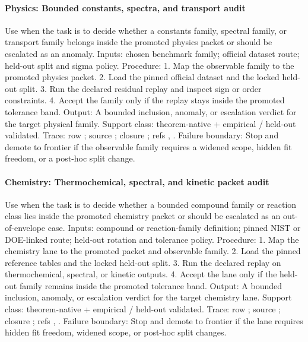 \paragraph{Physics: Bounded constants, spectra, and transport audit}
Use when the task is to decide whether a constants family, spectral family, or transport family belongs inside the promoted physics packet or should be escalated as an anomaly.
Inputs: chosen benchmark family; \allowbreak official dataset route; \allowbreak held-out split and sigma policy.
Procedure: 1. Map the observable family to the promoted physics packet. 2. Load the pinned official dataset and the locked held-out split. 3. Run the declared residual replay and inspect sign or order constraints. 4. Accept the family only if the replay stays inside the promoted tolerance band.
Output: A bounded inclusion, anomaly, or escalation verdict for the target physical family.
Support class: theorem-native + empirical / held-out validated.
Trace: row ; \allowbreak source ; \allowbreak closure ; \allowbreak refs , \allowbreak {}.
Failure boundary: Stop and demote to frontier if the observable family requires a widened scope, hidden fit freedom, or a post-hoc split change.

\paragraph{Chemistry: Thermochemical, spectral, and kinetic packet audit}
Use when the task is to decide whether a bounded compound family or reaction class lies inside the promoted chemistry packet or should be escalated as an out-of-envelope case.
Inputs: compound or reaction-family definition; \allowbreak pinned NIST or DOE-linked route; \allowbreak held-out rotation and tolerance policy.
Procedure: 1. Map the chemistry lane to the promoted packet and observable family. 2. Load the pinned reference tables and the locked held-out split. 3. Run the declared replay on thermochemical, spectral, or kinetic outputs. 4. Accept the lane only if the held-out family remains inside the promoted tolerance band.
Output: A bounded inclusion, anomaly, or escalation verdict for the target chemistry lane.
Support class: theorem-native + empirical / held-out validated.
Trace: row ; \allowbreak source ; \allowbreak closure ; \allowbreak refs , \allowbreak {}.
Failure boundary: Stop and demote to frontier if the lane requires hidden fit freedom, widened scope, or post-hoc split changes.

